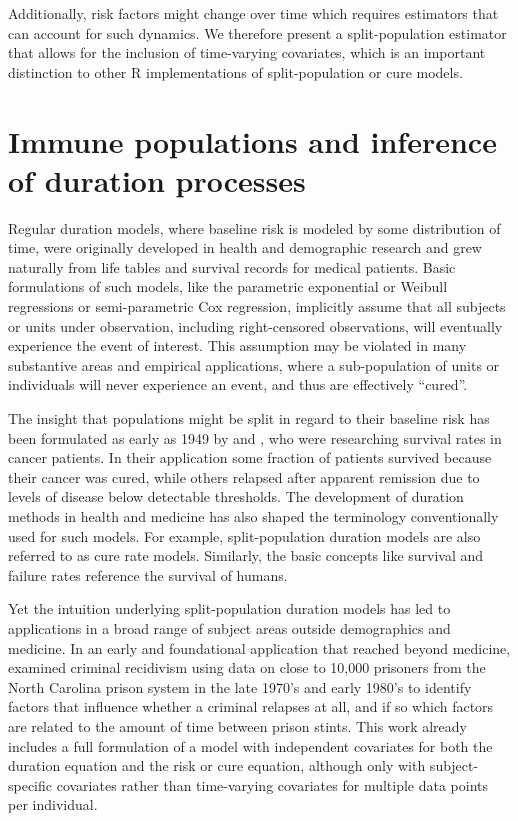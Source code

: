 Additionally, risk factors might change over time which requires estimators 
that can account for such dynamics. We therefore present a split-population 
estimator that allows for the inclusion of time-varying covariates, which is an 
important distinction to other R implementations of split-population or cure models.

\section{Immune populations and inference of duration
processes}

Regular duration models, where baseline risk is modeled by some
distribution of time, were originally developed in health and
demographic research and grew naturally from life tables and survival
records for medical patients. Basic formulations of such models, like
the parametric exponential or Weibull regressions or semi-parametric Cox
regression, implicitly assume that all subjects or units under
observation, including right-censored observations, will eventually
experience the event of interest. This assumption may be violated in
many substantive areas and empirical applications, where a
sub-population of units or individuals will never experience an event,
and thus are effectively ``cured''.

The insight that populations might be split in regard to their baseline
risk has been formulated as early as 1949 by \citet{boag1949maximum} and \citet{berkson1952survival}, who were researching survival rates in cancer patients. In
their application some fraction of patients survived because their
cancer was cured, while others relapsed after apparent remission due to
levels of disease below detectable thresholds. The development of
duration methods in health and medicine has also shaped the terminology
conventionally used for such models. For example, split-population
duration models are also referred to as cure rate models. Similarly, the
basic concepts like survival and failure rates reference the survival of
humans.

Yet the intuition underlying split-population duration models has led to
applications in a broad range of subject areas outside demographics and
medicine. In an early and foundational application that reached beyond
medicine, \citet{schmidt1989predicting} examined criminal recidivism using
data on close to 10,000 prisoners from the North Carolina prison system
in the late 1970's and early 1980's to identify factors that influence
whether a criminal relapses at all, and if so which factors are related
to the amount of time between prison stints. This work already includes
a full formulation of a model with independent covariates for both the
duration equation and the risk or cure equation, although only with
subject-specific covariates rather than time-varying covariates for
multiple data points per individual.

